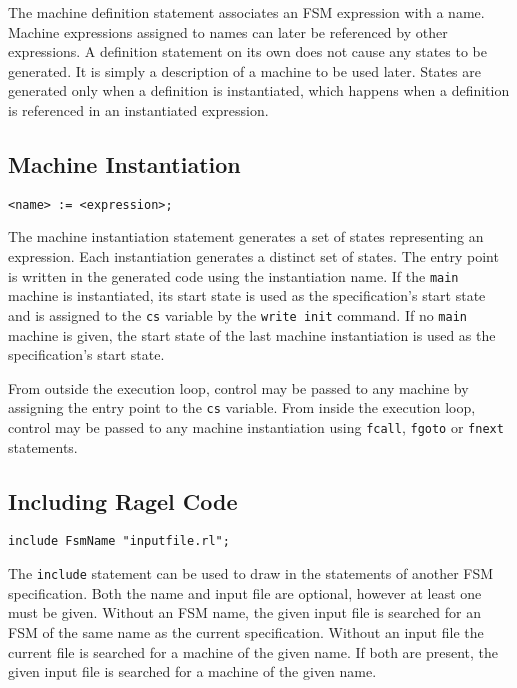 \documentclass[letterpaper,11pt,oneside]{book}
\newcommand{\verbspace}{\vspace{10pt}}
\begin{document}
The machine definition statement associates an FSM expression with a name.  Machine
expressions assigned to names can later be referenced by other expressions.  A
definition statement on its own does not cause any states to be generated. It is simply a
description of a machine to be used later. States are generated only when a definition is
instantiated, which happens when a definition is referenced in an instantiated
expression. 

\subsection{Machine Instantiation}
\label{instantiation}

\begin{verbatim}
<name> := <expression>;
\end{verbatim}
\verbspace

The machine instantiation statement generates a set of states representing an
expression. Each instantiation generates a distinct set of states.  The entry
point is written in the generated code using the instantiation name.  If the
\verb|main| machine is instantiated, its start state is used as the
specification's start state and is assigned to the \verb|cs| variable by the
\verb|write init| command. If no \verb|main| machine is given, the start state
of the last machine instantiation is used as the specification's start state.

From outside the execution loop, control may be passed to any machine by
assigning the entry point to the \verb|cs| variable.  From inside the execution
loop, control may be passed to any machine instantiation using \verb|fcall|,
\verb|fgoto| or \verb|fnext| statements.

\subsection{Including Ragel Code}

\begin{verbatim}
include FsmName "inputfile.rl";
\end{verbatim}
\verbspace

The \verb|include| statement can be used to draw in the statements of another FSM
specification. Both the name and input file are optional, however at least one
must be given. Without an FSM name, the given input file is searched for an FSM
of the same name as the current specification. Without an input file the
current file is searched for a machine of the given name. If both are present,
the given input file is searched for a machine of the given name.
\end{document}
